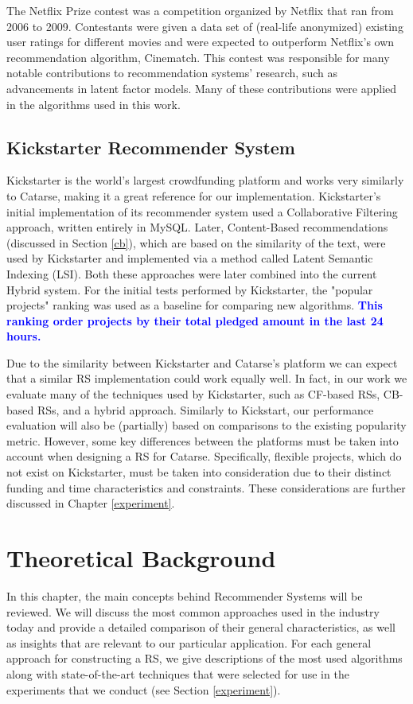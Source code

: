 \documentclass[cic,tc,english]{iiufrgs}
\newcommand{\adriano}[1]{\textcolor{blue}{\textbf{#1}}}
\begin{document}
The Netflix Prize contest was a competition organized by Netflix that ran from 2006 to 2009. Contestants were given a data set of (real-life anonymized) existing user ratings for different movies and were expected to outperform Netflix's own recommendation algorithm, Cinematch. This contest was responsible for many notable contributions to recommendation systems' research, such as advancements in latent factor models. Many of these contributions were applied in the algorithms used in this work.

\section{Kickstarter Recommender System}
Kickstarter is the world's largest crowdfunding platform and works very similarly to Catarse, making it a great reference for our implementation. Kickstarter's initial implementation of its recommender system used a Collaborative Filtering approach, written entirely in MySQL. Later, Content-Based recommendations (discussed in Section \ref{cb}), which are based on the similarity of the text, were used by Kickstarter and implemented via a method called Latent Semantic Indexing (LSI). Both these approaches were later combined into the current Hybrid system. For the initial tests performed by Kickstarter, the "popular projects" ranking was used as a baseline for comparing new algorithms. \adriano{This ranking order projects by their total pledged amount in the last 24 hours.}

Due to the similarity between Kickstarter and Catarse's platform we can expect that a similar RS implementation could work equally well. In fact, in our work we evaluate many of the techniques used by Kickstarter, such as CF-based RSs, CB-based RSs, and a hybrid approach. Similarly to Kickstart, our performance evaluation will also be (partially) based on comparisons to the existing popularity metric. However, some key differences between the platforms must be taken into account when designing a RS for Catarse. Specifically, flexible projects, which do not exist on Kickstarter, must be taken into consideration due to their distinct funding and time characteristics and constraints. These considerations are further discussed in Chapter \ref{experiment}.

\chapter{Theoretical Background} \label{background}
In this chapter, the main concepts behind Recommender Systems will be reviewed. We will discuss the most common approaches used in the industry today and provide a detailed comparison of their general characteristics, as well as insights that are relevant to our particular application. For each general approach for constructing a RS, we give descriptions of the most used algorithms along with state-of-the-art techniques that were selected for use in the experiments that we conduct (see Section \ref{experiment}).
\end{document}

